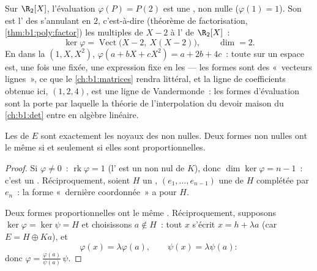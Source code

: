\begin{example}
\label{ex:b1:linmaps:evaluationform}
Sur $\R_2[X]$, l'évaluation $\varphi(P) = P(2)$ est une , non nulle ($\varphi(1) = 1$). Son  est l'
des  s'annulant en $2$, c'est-à-dire (théorème de factorisation,
\cref{thm:b1:poly:factor}) les multiples de $X - 2$ à l' de
$\R_2[X]$~:
\[
\ker\varphi = \operatorname{Vect}\bigl(X - 2,\ X(X - 2)\bigr),
\qquad \dim = 2 .
\]
En  dans la  $(1, X, X^2)$, $\varphi(a + bX + cX^2) = a +
2b + 4c$~: toute  sur un espace  est,
une fois une  fixée, une expression  fixe en les
 --- les formes sont des «~vecteurs lignes~», ce que le
\cref{ch:b1:matrices} rendra littéral, et la ligne de coefficients
obtenue ici, $(1, 2, 4)$, est une ligne de Vandermonde~: les formes
d'évaluation sont la porte par laquelle la théorie de l'interpolation du
devoir maison du \cref{ch:b1:det} entre en algèbre linéaire.
\end{example}

\begin{theorem}\label{thm:b1:linmaps:hyperplanes}
Les  de $E$ sont exactement les noyaux des 
non nulles. Deux formes non nulles ont le même  si et seulement si elles
sont proportionnelles.
\end{theorem}

\begin{proof}
Si $\varphi \neq 0$~: $\operatorname{rk}\varphi = 1$ (l' est un
 non nul de $K$), donc $\dim\ker\varphi = n - 1$~: c'est un .
Réciproquement, soient $H$ un , $(e_1, \dots, e_{n-1})$ une 
de $H$ complétée par $e_n$~: la forme «~dernière coordonnée~» a pour 
$H$.

Deux formes proportionnelles ont le même . Réciproquement, supposons
$\ker\varphi = \ker\psi = H$ et choisissons $a \notin H$~: tout $x$ s'écrit
$x = h + \lambda a$ (car $E = H \oplus Ka$), et
\[
\varphi(x) = \lambda \varphi(a), \qquad \psi(x) = \lambda\psi(a):
\]
donc $\varphi = \frac{\varphi(a)}{\psi(a)}\,\psi$.
\end{proof}


